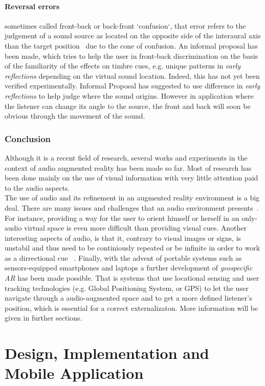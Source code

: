 \documentclass[journal]{IEEEtran}
\begin{document}
\paragraph{Reversal errors}
sometimes called front-back or back-front `confusion`, that error refers to the judgement of a sound source as located on the opposite side of the interaural axis than the target position~\cite{} due to the cone of confusion. An informal proposal has been made, which tries to help the user in front-back discrimination on the basis of the familiarity of the effects on timbre cues, e.g. unique patterns in \emph{early reflections} depending on the virtual sound location. Indeed, this has not yet been verified experimentally. Informal Proposal has suggested to use difference in \emph{early reflections} to help judge where the sound origins. However in application where the listener can change its angle to the source, the front and back will soon be obvious through the movement of the sound.

\subsubsection{Conclusion}
Although it is a recent field of research, several works and experiments in the context of audio augmented reality has been made so far. Most of research has been done mainly on the use of visual information with very little attention paid to the audio aspects.\\ 
The use of audio and its refinement in an augmented reality environment is a big deal. There are many issues and challenges that an audio environment presents~\cite{}. For instance, providing a way for the user to orient himself or herself in an only-audio virtual space is even more difficult than providing visual cues. Another interesting aspects of audio, is that it, contrary to visual images or signs, is unstabil and thus need to be continiously repeated or be infinite in order to work as a dirrectional cue ~\cite{}.   
Finally, with the advent of portable systems such as sensors-equipped smartphones and laptops a further development of \emph{geospecific AR} has been made possible. That is systems that use locational sensing and user tracking technologies (e.g. Global Positioning System, or GPS) to let the user navigate through a audio-augmented space and to get a more defined listener's position, which is essential for a correct externalizaton. More information will be given in further sections.
	
\section{Design, Implementation and Mobile Application}
\end{document}
